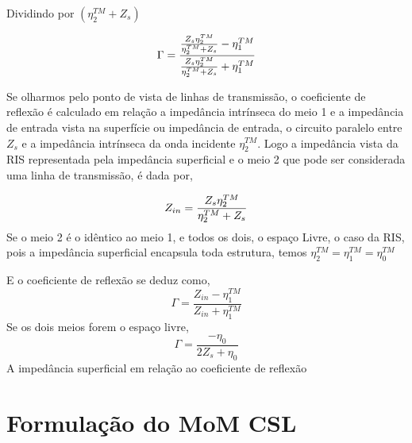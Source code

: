 \documentclass[
	12pt,				%
	openright,			%
	oneside,			%
	a4papey79r,			%
	english,			%
	brazil				%
	]{abntex2}
\begin{document}
Dividindo por $(\eta_2^{TM}+Z_s) $

\begin{equation}{\label{CoefReflexaoParaleloZsEta2}}
   \Gamma= \frac{\frac{Z_s \eta_2^{TM} }{\eta_2^{TM}+Z_s}-\eta_1^{TM}}
    {\frac{Z_s \eta_2^{TM} }{\eta_2^{TM}+Z_s}+\eta_1^{TM}}
\end{equation}

Se olharmos pelo ponto de vista de linhas de transmissão, o coeficiente de reflexão  é calculado em relação a impedância intrínseca do meio 1 e a impedância de entrada vista na superfície ou impedância de entrada, o circuito paralelo  entre $Z_s$ e a impedância intrínseca da onda incidente $\eta^{TM}_{2}$. Logo a impedância vista da RIS representada pela impedância superficial e o meio 2 que pode ser considerada uma linha de transmissão, é dada por,

\begin{equation}{\label{ImpedanciaZinParaleloZsEta2}}
   Z_{in}= \frac{Z_s \eta_2^{TM} }{\eta_2^{TM}+Z_s}
\end{equation}
Se o meio 2 é o idêntico ao meio 1, e todos os dois, o espaço Livre, o caso da RIS, pois a impedância superficial encapsula toda estrutura, temos $\eta^{TM}_{2}=\eta^{TM}_1=\eta^{TM}_0$

E o coeficiente de reflexão se deduz como,
\begin{equation}
   \Gamma= \frac{Z_{in}-\eta_1^{TM}}
    {Z_{in}+\eta_1^{TM}}
\end{equation}
Se os dois meios forem o espaço livre,
\begin{equation}
    \Gamma=\frac{-\eta_0}{2Z_s+\eta_0}
\end{equation}
A impedância superficial em relação ao coeficiente de reflexão



\chapter{Formulação do MoM CSL}\label{FormulaçãoMoMCSL}
\end{document}
